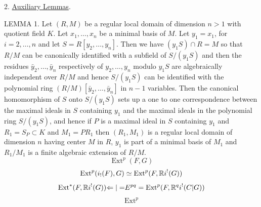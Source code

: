 2. \uline{Auxiliary Lemmas}.

LEMMA 1. Let $(R,M)$ be a regular local domain of dimension $n>1$ with quotient field $K$. Let $x_1,\ldots,x_n$ be a minimal basis of $M$. Let $y_1=x_1$,   for $i=2,\ldots,n$ and let $S=R[y_2,\ldots,y_n]$. Then we have $(y_1S)\cap R=M$ so that $R/M$ can be canonically identified with a subfield of $S/(y_1S)$ and then the residues $\bar y_2,\ldots,\bar y_n$ respectively of $y_2,\ldots,y_n$ modulo $y_1S$ are algebraically independent over $R/M$ and hence $S/(y_1S)$ can be identified with the polynomial ring $(R/M)[\bar y_2,\ldots,\bar y_n]$ in $n-1$ variables. Then the canonical homomorphism of $S$ onto $S/(y_1S)$ sets up a one to one correspondence between the maximal ideals in $S$ containing $y_1$ and the maximal ideals in the polynomial ring $S/(y_1S)$, and hence if $P$ is a maximal ideal in $S$ containing $y_1$ and $R_1=S_P\subset K$ and $M_1=PR_1$ then $(R_1,M_1)$ is a regular local domain of dimension $n$ having center $M$ in $R$, $y_1$ is part of a minimal basis of $M_1$ and $R_1/M_1$ is a finite algebraic extension of $R/M$.
\[
\operatorname{Ext}^p(F,G)
\]
\[
\operatorname{Ext}^{{p}}(i_!(F),G)\simeq\operatorname{Ext}^p(F,\mathbb{R}i^!(G))
\]
\[
\operatorname{Ext}^*(F,\mathbb{R}i^!(G)){\Leftarrow|=}E^{pq}=\operatorname{Ext}^p(F,\mathbb{R}^qi^!({C|G}))
\]
\[
\operatorname{Ext}^p
\]
